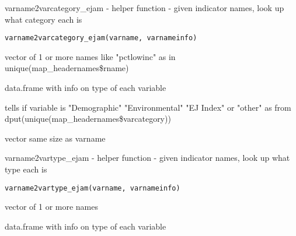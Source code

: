 \documentclass[a4paper]{book}
\begin{document}
%
\begin{Description}\relax
varname2varcategory\_ejam - helper function - given indicator names, look up what category each is
\end{Description}
%
\begin{Usage}
\begin{verbatim}
varname2varcategory_ejam(varname, varnameinfo)
\end{verbatim}
\end{Usage}
%
\begin{Arguments}
\begin{ldescription}
\item[\code{varname}] vector of 1 or more names like "pctlowinc" as in unique(map\_headernames\$rname)

\item[\code{varnameinfo}] data.frame with info on type of each variable
\end{ldescription}
\end{Arguments}
%
\begin{Details}\relax
tells if variable is "Demographic" "Environmental" "EJ Index" or "other"
as from dput(unique(map\_headernames\$varcategory))
\end{Details}
%
\begin{Value}
vector same size as varname
\end{Value}
%
\begin{SeeAlso}\relax
{} 
\end{SeeAlso}
%
\begin{Description}\relax
varname2vartype\_ejam - helper function - given indicator names, look up what type each is
\end{Description}
%
\begin{Usage}
\begin{verbatim}
varname2vartype_ejam(varname, varnameinfo)
\end{verbatim}
\end{Usage}
%
\begin{Arguments}
\begin{ldescription}
\item[\code{varname}] vector of 1 or more names

\item[\code{varnameinfo}] data.frame with info on type of each variable
\end{ldescription}
\end{Arguments}
\end{document}

